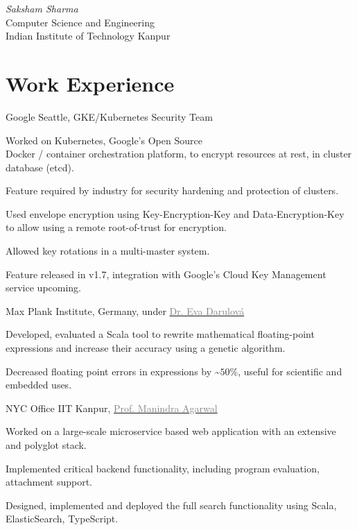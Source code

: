\documentclass{tccv}
\begin{document}
{ \textit{Saksham \textcolor{myred}{Sharma}}}
\medskip\\
\large{Computer Science and Engineering}\\
{Indian Institute of Technology Kanpur}

\vspace{-0.5cm}
\section{Work Experience}
\begin{experience}
  {Google Seattle, GKE/Kubernetes Security Team}
  {
  \item Worked on Kubernetes, Google's Open Source \\Docker / container orchestration platform, to
    encrypt resources at rest, in cluster database (etcd).
  \item Feature required by industry for security hardening and protection of clusters.
  \item Used envelope encryption using Key-Encryption-Key and Data-Encryption-Key to allow
    using a remote root-of-trust for encryption.
  \item Allowed key rotations in a multi-master system.
  \item Feature released in v1.7, integration with Google's Cloud Key Management service upcoming.
  }

  {Max Plank Institute, \small{Germany}, under
  \href{http://www.mpi-sws.org/~eva}{\textcolor{gray}{Dr. Eva
      Darulová}}}
  {
  \item Developed, evaluated a Scala tool to rewrite
    mathematical floating-point expressions and increase their
    accuracy using a genetic algorithm.
  \item Decreased floating point errors in expressions by
    \~$50\%$, useful for scientific and embedded uses.
  }

  {NYC Office IIT Kanpur,
    \href{http://cse.iitk.ac.in/~manindra}{\textcolor{gray}{Prof. Manindra Agarwal}}}
  {
  \item Worked on a large-scale microservice based web
    application with an extensive and polyglot stack.
  \item Implemented critical backend functionality, including program evaluation, attachment support.
  \item Designed, implemented and deployed the full search functionality using Scala, ElasticSearch, TypeScript.
  }
\end{experience}
\end{document}

